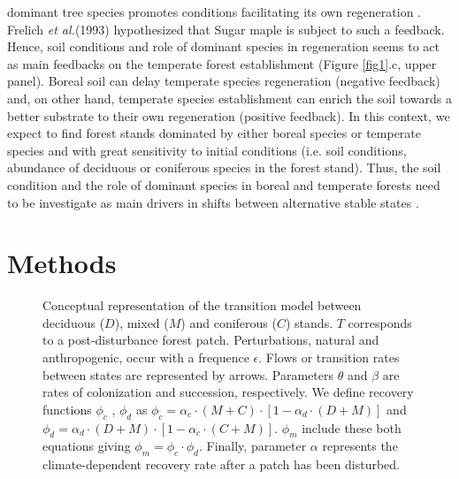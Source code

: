 dominant tree species promotes conditions facilitating its own regeneration
\cite{Barras1998}. Frelich \textit{et al.}(1993) \cite{Society2014}
hypothesized that Sugar maple is subject to such a feedback. Hence, soil
conditions and role of dominant species in regeneration seems to act as main
feedbacks on the temperate forest establishment (Figure \ref{fig1}.c, upper
panel). Boreal soil can delay temperate species regeneration (negative
feedback) and, on other hand, temperate species establishment can enrich the
soil towards a better substrate to their own regeneration (positive feedback).
In this context, we expect to find forest stands dominated by either boreal
species or temperate species and with great sensitivity to initial conditions
(i.e. soil conditions, abundance of deciduous or coniferous
species in the forest stand). Thus, the soil condition and the role of
dominant species in boreal and temperate forests need to be investigate as main
drivers in shifts between alternative stable states
\cite{Kellman2004,Moore2008,DeFrenne2013,Barras1998}.

\section{Methods}   

\begin{figure}
	
	\caption{Conceptual representation of the transition model between deciduous ($D$),
	mixed ($M$) and coniferous ($C$) stands. $T$ corresponds to a post-disturbance forest patch. Perturbations, natural and anthropogenic, occur with a frequence $\epsilon$. 
	Flows or transition rates between states are represented by arrows.
	Parameters $\theta$ and $\beta$ are rates of colonization and succession,
	respectively. We define recovery functions $\phi_c$ , $\phi_d$ as $\phi_c
	= \alpha_c \cdot (M+C) \cdot [1- \alpha_d \cdot (D+M)]$ and $\phi_d =
	\alpha_d \cdot (D+M) \cdot [1- \alpha_c \cdot (C+M)]$. $\phi_m$ include these both equations giving $\phi_m = \phi_c \cdot \phi_d$. Finally, parameter $\alpha$ represents the climate-dependent recovery rate after a patch has been disturbed.}
	\label{Model}
	\vspace{-1em}
\end{figure}


%


